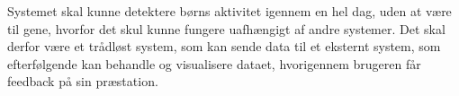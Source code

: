 Systemet skal kunne detektere børns aktivitet igennem en hel dag, uden at være til gene, hvorfor det skul kunne fungere uafhængigt af andre systemer. Det skal derfor være et trådløst system, som kan sende data til et eksternt system, som efterfølgende kan behandle og visualisere dataet, hvorigennem brugeren får feedback på sin præstation.  

%

